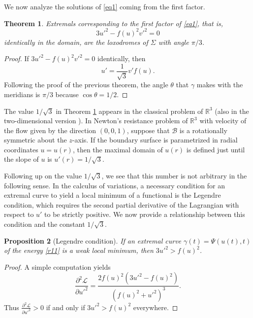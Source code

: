 \documentclass[a4paper,12pt]{amsart}
\newtheorem{theorem}{Theorem}[section]
\newtheorem{proposition}[theorem]{Proposition}
\theoremstyle{definition}
\def\r{\mathbb R}
\begin{document}
We now analyze the solutions of \eqref{eq1} coming from the first factor.

\begin{theorem}\label{t36}
  Extremals corresponding to the first factor of \eqref{eq1}, that is, 
$$ 3u'^2 - f(u)^2 v'^2 =0$$
identically in the domain, are the loxodromes of $\Sigma$ with angle $\pi/3$. 
\end{theorem}
 
 \begin{proof}
If $ 3u'^2 - f(u)^2 v'^2 =0$ identically, then 
$$u'=\frac{1}{\sqrt{3}}v'f(u).$$
 Following the proof of the previous theorem, the angle $\theta$ that $\gamma$ makes with the meridians is $\pi/3$ because $\cos\theta= 1/2$. 
\end{proof}

The value $1/\sqrt{3}$ in Theorem \ref{t36} appears in the classical problem  of $\r^3$ (also in the two-dimensional version \cite{st}).  In Newton's resistance problem of $\r^3$ with velocity of the flow given by the direction $(0,0,1)$, suppose that   $\mathcal{B}$ is a rotationally symmetric about the $z$-axis. If  the boundary surface is    parametrized in radial coordinates $u=u(r)$, then the maximal domain of $u(r)$ is defined just until the slope of $u$ is $u'(r)=1/\sqrt{3}$.  


Following up on  the value $1/\sqrt{3}$, we see that this number is not arbitrary in the following 
sense. In the calculus of variations, a necessary condition for an extremal curve to yield a local 
minimum of a functional is the Legendre condition, which requires the second partial derivative 
of the Lagrangian with respect to $u'$ to be strictly positive. We now provide a relationship between 
this condition and the constant $1/\sqrt{3}$.

\begin{proposition}[Legendre condition] \label{pr37}
 If an extremal curve $\gamma(t)=\Psi(u(t),t)$ of the energy \eqref{r11} is a weak local minimum, then $3u'^2 > f(u)^2$. 
\end{proposition}

\begin{proof}
 A simple computation yields
\begin{equation*}
\frac{\partial^2 \mathcal{L}}{\partial u'^2} = \frac{2f(u)^2 \left( 3u'^2 - f(u)^2 \right)}{\left( f(u)^2 + u'^2 \right)^3}.
\end{equation*}
Thus $ \frac{\partial^2 \mathcal{L}}{\partial u'^2} >0$ if and only if $3u'^2 >f(u)^2$ everywhere. 
\end{proof}
\end{document}
